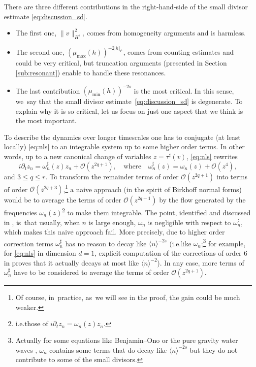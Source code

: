 \documentclass[10pt,a4paper]{amsart}
\providecommand{\ie}{i.e.}
\theoremstyle{plain}
\theoremstyle{definition}
\newcommand{\1}{\mathbf{1}}
\begin{document}
There are three different contributions in the right-hand-side of the small divisor estimate \eqref{eq:discussion_sd}.
\begin{itemize}
\item The first one, $\| v\|_{H^s}^2$, comes from homogeneity arguments and is harmless.
\item The second one, $(\mu_{\max}(h))^{-2|h|_{\ell^1}}$, comes from counting estimates and could be very critical, but truncation arguments (presented in Section \ref{sub:resonant}) enable to handle these resonances.
\item The last contribution $(\mu_{\min}(h))^{-2s}$ is the most critical. In this sense, we~say that the small divisor estimate~\eqref{eq:discussion_sd} is degenerate. To explain why it is so critical, let us focus on just one aspect that we think is the most important.
\end{itemize}

To describe the dynamics over longer timescales one has to conjugate (at least locally) \eqref{eq:nls} to an integrable system up to some higher order terms. In other words, up to a new canonical change of variables $z = \tau^\sharp(v)$, \eqref{eq:nls} rewrites
\[
i\partial_t z_n = \omega_n^\sharp(z) z_n + \mathcal{O}(z^{2q+1}), \quad \mathrm{where} \quad \omega_n^\sharp(z) = \omega_n(z) + \mathcal{O}(z^4),
\]
and $3\leq q \leq r$. To transform the remainder terms of order $\mathcal{O}(z^{2q+1})$ into terms of order $\mathcal{O}(z^{2q+3})$,\footnote{Of course, in~practice, as~we will see in the proof, the gain could be much weaker.} a naive approach (in the spirit of Birkhoff normal forms) would be to average the terms of order $\mathcal{O}(z^{2q+1})$ by the flow generated by the frequencies $\omega_n(z)$\footnote{\ie those of $i\partial_t z_n = \omega_n(z) z_n$.} to make them integrable. The point, identified and discussed in \cite{KillBill}, is~that usually, when $n$ is large enough, $\omega_n$ is negligible with respect to $\omega_n^\sharp$, which makes this naive approach fail. More precisely, due to higher order correction terms $\omega_n^\sharp$ has no reason to decay like $\langle n \rangle^{-2s}$ (\ie like $\omega_n$;\footnote{Actually for some equations like Benjamin--Ono \cite{KtA} or the pure gravity water waves \cite{BFP23}, $\omega_n$ contains some terms that do decay like $\langle n \rangle^{-2s}$ but they do not contribute to some of the small divisors.} for example, for \eqref{eq:nls} in dimension $d=1$, explicit computation of the corrections of order 6 in \cite{KillBill} proves that it actually decays at most like $\langle n \rangle^{-2}$). In any case, more terms of $\omega_n^\sharp$ have to be considered to average the terms of order $\mathcal{O}(z^{2q+1})$.
\end{document}
